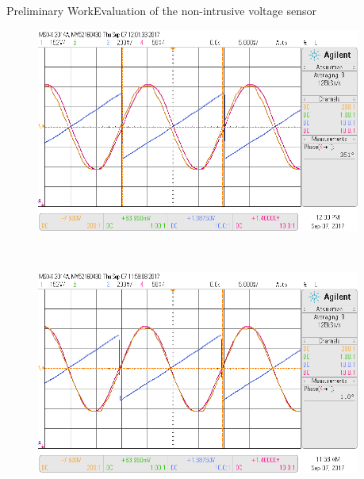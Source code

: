 \begin{frame}{Preliminary Work}{Evaluation of the non-intrusive voltage sensor}
\begin{figure}[h!]
	\centering
	\begin{minipage}{.48\textwidth}
		\centering
		\includegraphics[width=0.95\textwidth,keepaspectratio]{figures/50.PreliminaryW/scope_9}
		\label{fig:5.scope_9}
	\end{minipage}%
	\begin{minipage}{.01\textwidth}  ~\end{minipage}	
	\begin{minipage}{.48\textwidth}
		\centering
		\includegraphics[width=0.95\textwidth,keepaspectratio]{figures/50.PreliminaryW/scope_10}
		\label{fig:5.scope_10}
	\end{minipage}
\end{figure}
\end{frame}
